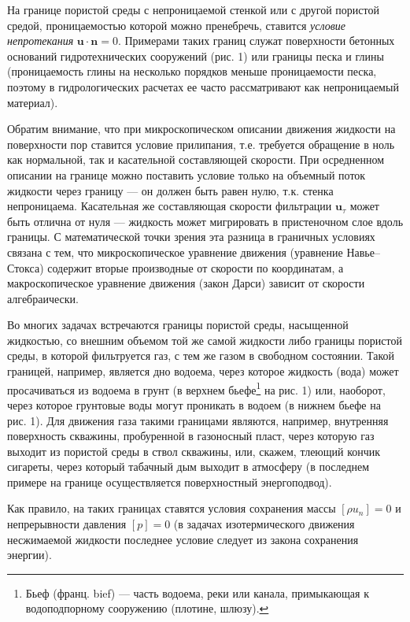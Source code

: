 На границе пористой среды с непроницаемой стенкой или с другой пористой средой, проницаемостью которой можно пренебречь, ставится \textit{условие непротекания} $\boldsymbol{u}\cdot\boldsymbol{n}=0$. Примерами таких границ служат поверхности бетонных оснований гидротехнических сооружений (рис. 1) или границы песка и глины (проницаемость глины на несколько порядков меньше проницаемости песка, поэтому в гидрологических расчетах ее часто рассматривают как непроницаемый материал).

Обратим внимание, что при микроскопическом описании движения жидкости на поверхности пор ставится условие прилипания, т.е. требуется обращение в ноль как нормальной, так и касательной составляющей скорости. При осредненном описании на границе можно поставить условие только на объемный поток
жидкости через границу --- он должен быть равен нулю, т.к. стенка непроницаема. Касательная же составляющая скорости фильтрации $\boldsymbol{u}_\tau$ может быть отлична от нуля --- жидкость может мигрировать в пристеночном слое вдоль границы. С математической точки зрения эта разница в граничных условиях связана с тем, что микроскопическое уравнение движения (уравнение Навье--Стокса) содержит вторые производные от скорости по координатам, а макроскопическое уравнение движения (закон Дарси) зависит от скорости алгебраически.

Во многих задачах встречаются границы пористой среды, насыщенной жидкостью, со внешним объемом той же самой жидкости либо границы пористой среды, в которой фильтруется газ, с тем же газом в свободном состоянии. Такой границей, например, является дно водоема, через которое жидкость (вода) может просачиваться из водоема в грунт (в верхнем бьефе\setcounter{footnote}{0}\footnote{Бьеф (франц. bief) --- часть водоема, реки или канала, примыкающая к водоподпорному сооружению (плотине, шлюзу).} на рис. 1) или, наоборот, через которое грунтовые воды могут проникать в водоем (в нижнем бьефе на рис. 1). Для движения газа такими границами являются, например, внутренняя поверхность скважины, пробуренной в газоносный пласт, через которую газ выходит из пористой среды в ствол скважины, или, скажем, тлеющий кончик сигареты, через который табачный дым выходит в атмосферу (в последнем примере на границе осуществляется поверхностный энергоподвод).

Как правило, на таких границах ставятся условия сохранения массы $[\rho u_n]=0$ и непрерывности давления $[p]=0$ (в задачах изотермического движения несжимаемой жидкости последнее условие следует из закона сохранения энергии).

